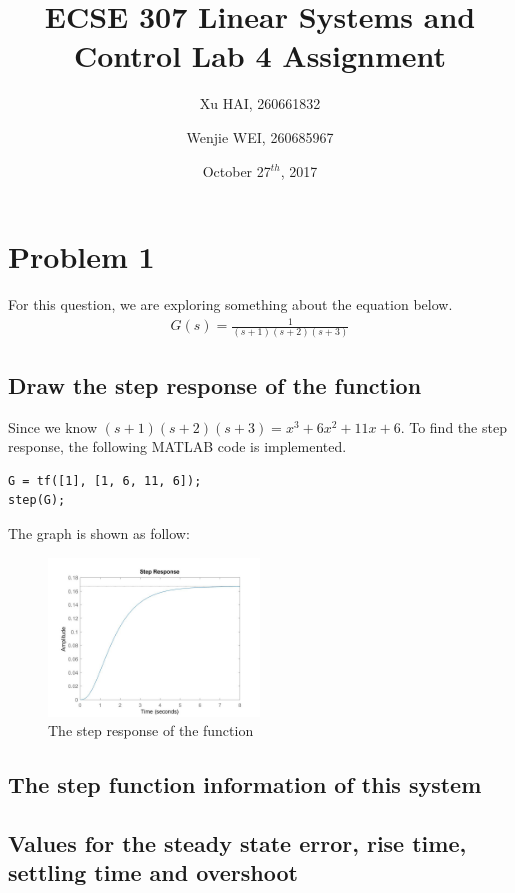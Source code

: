 \documentclass[a4paper, titlepage, twocolumn, 10pt]{article}
\title{\textbf{ECSE 307 Linear Systems and Control} \linebreak Lab 4 Assignment}
\author{Xu HAI, 260661832 \and Wenjie WEI, 260685967}
\date{October 27$^{th}$, 2017}
\begin{document}
	\maketitle
	\newpage
	
	
    \section{Problem 1}
	For this question, we are exploring something about the equation below.
	\begin{align}
	G(s)=\frac{1}{(s+1)(s+2)(s+3)} \label{limit}
	\end{align}
	\subsection{Draw the step response of the function}
	Since we know $(s+1)(s+2)(s+3) = x^3 + 6x^2 + 11x + 6$. To find the step response, the following MATLAB code is implemented.
	\begin{lstlisting}[frame=single]
G = tf([1], [1, 6, 11, 6]);
step(G);
	\end{lstlisting}
	The graph is shown as follow:
	\begin{figure}[H]
		\centering
		\includegraphics[width=0.5\textwidth]{1-a}
		\caption{The step response of the function}
		\label{1-a}
	\end{figure}

	\subsection{The step function information of this system}
	
	\subsection{Values for the steady state error, rise time, settling time and overshoot}
	
\end{document}
